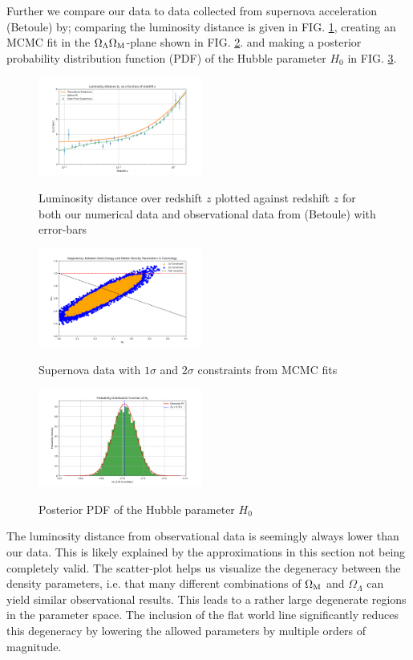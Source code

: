 \documentclass[%
reprint,
 amsmath,amssymb,
 aps,
]{revtex4-2}
\begin{document}
Further we compare our data to data collected from supernova acceleration (Betoule) by; comparing the luminosity distance is given in FIG. \ref{LumiDistance}, creating an MCMC fit in the $\Omega_\Lambda\Omega_\text M$-plane shown in FIG. \ref{scatt}. and making a posterior probability distribution function (PDF) of the Hubble parameter $H_0$ in FIG. \ref{PDEh}.
\begin{figure}[H]
	\caption{Luminosity distance over redshift $z$ plotted against redshift $z$ for both our numerical data and observational data from (Betoule) with error-bars}
	\includegraphics[width = 0.48\textwidth]{Figures/LumiDistance.png}
	\label{LumiDistance}
\end{figure}
\begin{figure}
	\caption{Supernova data with $1\sigma$ and $2\sigma$ constraints from MCMC fits}
	\includegraphics[width = 0.48\textwidth]{Figures/ScattPlot.png}
	\label{scatt}
\end{figure}
\begin{figure}
\caption{Posterior PDF of the Hubble parameter $H_0$}
\includegraphics[width = 0.48\textwidth]{Figures/PDEh.png}
\label{PDEh}
\end{figure}

The luminosity distance from observational data is seemingly always lower than our data. This is likely explained by the approximations in this section not being completely valid. The scatter-plot helps us visualize the degeneracy between the density parameters, i.e. that many different combinations of $\Omega_\text M$ and $\Omega_{\Lambda}$ can yield similar observational results. This leads to a rather large degenerate regions in the parameter space. The inclusion of the flat world line significantly reduces this degeneracy by lowering the allowed parameters by multiple orders of magnitude.
\end{document}
